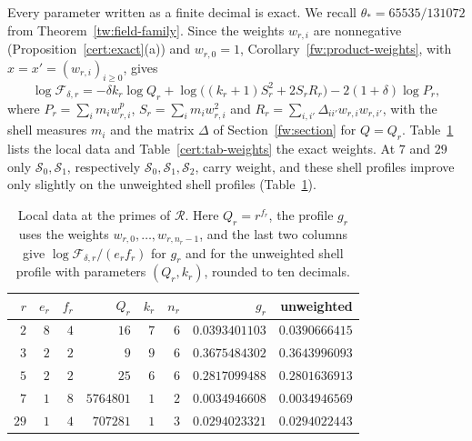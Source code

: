 \documentclass[11pt]{amsart}
\numberwithin{equation}{section}
\theoremstyle{definition}
\theoremstyle{remark}
\newcommand{\thetastar}{65535/131072}
\begin{document}
Every parameter written as a finite decimal is exact. We recall
$\theta_*=\thetastar$ from Theorem~\ref{tw:field-family}. Since the
weights $w_{r,i}$ are nonnegative (Proposition~\ref{cert:exact}(a)) and
$w_{r,0}=1$,
Corollary~\ref{fw:product-weights}, with $x=x'=(w_{r,i})_{i\ge0}$, gives
\begin{equation}\label{cert:finite-factor}
 \log\mathcal F_{\delta,r}
 =-\delta k_r\log Q_r+\log\bigl((k_r+1)S_r^2+2S_rR_r\bigr)
 -2(1+\delta)\log P_r,
\end{equation}
where $P_r=\sum_im_iw_{r,i}^p$, $S_r=\sum_im_iw_{r,i}^2$ and
$R_r=\sum_{i,i'}\Delta_{ii'}w_{r,i}w_{r,i'}$, with the shell measures
$m_i$ and the matrix $\Delta$ of Section~\ref{fw:section} for $Q=Q_r$.
Table~\ref{cert:tab-local} lists the local data and
Table~\ref{cert:tab-weights} the exact weights. At $7$ and $29$ only
$\mathcal S_0,\mathcal S_1$, respectively $\mathcal S_0,\mathcal
S_1,\mathcal S_2$, carry weight, and these shell profiles improve only
slightly on the unweighted shell profiles (Table~\ref{cert:tab-local}).

\begin{table}[htbp]
\centering\small
\caption{Local data at the primes of $\mathcal R$. Here $Q_r=r^{f_r}$,
the profile $g_r$ uses the weights $w_{r,0},\dots,w_{r,n_r-1}$, and the
last two columns give $\log\mathcal F_{\delta,r}/(e_rf_r)$ for $g_r$
and for the unweighted shell profile with parameters $(Q_r,k_r)$,
rounded to ten decimals.}
\label{cert:tab-local}
\begin{tabular}{rrrrrrrr}
\toprule
$r$ & $e_r$ & $f_r$ & $Q_r$ & $k_r$ & $n_r$ & $g_r$ & unweighted\\
\midrule
$2$ & $8$ & $4$ & $16$ & $7$ & $6$ & $0.0393401103$ & $0.0390666415$\\
$3$ & $2$ & $2$ & $9$ & $9$ & $6$ & $0.3675484302$ & $0.3643996093$\\
$5$ & $2$ & $2$ & $25$ & $6$ & $6$ & $0.2817099488$ & $0.2801636913$\\
$7$ & $1$ & $8$ & $5764801$ & $1$ & $2$ & $0.0034946608$ & $0.0034946569$\\
$29$ & $1$ & $4$ & $707281$ & $1$ & $3$ & $0.0294023321$ & $0.0294022443$\\
\bottomrule
\end{tabular}
\end{table}
\end{document}
